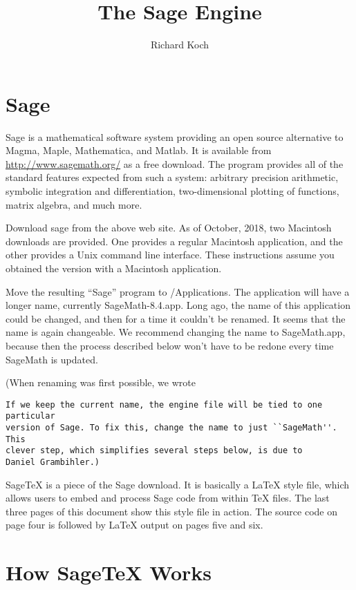 \documentclass[11pt, oneside]{amsart}
\title{The Sage Engine}
\author{Richard Koch}
\begin{document}
\maketitle
\vspace{-.3in}
\section{Sage}
Sage is a mathematical software system providing an open source alternative to Magma, Maple, Mathematica, and Matlab. It is available from 
\url{http://www.sagemath.org/} as a free download. The program provides all of the standard features expected from such a system: arbitrary precision arithmetic, symbolic integration and differentiation, two-dimensional plotting of functions, matrix algebra, and much more.

Download sage from the above web site. As of October, 2018, two Macintosh downloads are provided. One provides a regular Macintosh application, and the other provides a Unix command line interface. These instructions assume you obtained the version with a Macintosh application.

Move the resulting ``Sage'' program to /Applications. The
application will have a longer name, currently SageMath-8.4.app.  Long ago, the name of this application could be changed, and then for a time it couldn't be renamed. It seems that the name is again changeable.  We recommend changing the name to SageMath.app, because then the process described below won't have to be redone every time SageMath is updated.

(When renaming was first possible, we wrote 
\begin{verbatim}
If we keep the current name, the engine file will be tied to one particular
version of Sage. To fix this, change the name to just ``SageMath''. This 
clever step, which simplifies several steps below, is due to 
Daniel Grambihler.)
\end{verbatim}


SageTeX is a piece of the Sage download. It is basically a LaTeX style file, which  allows users to embed and process Sage code from within TeX files. The last three pages of this document show this style file in action. The source code on page four is followed by LaTeX output on pages five and six.

\section{How SageTeX Works}
\end{document}
